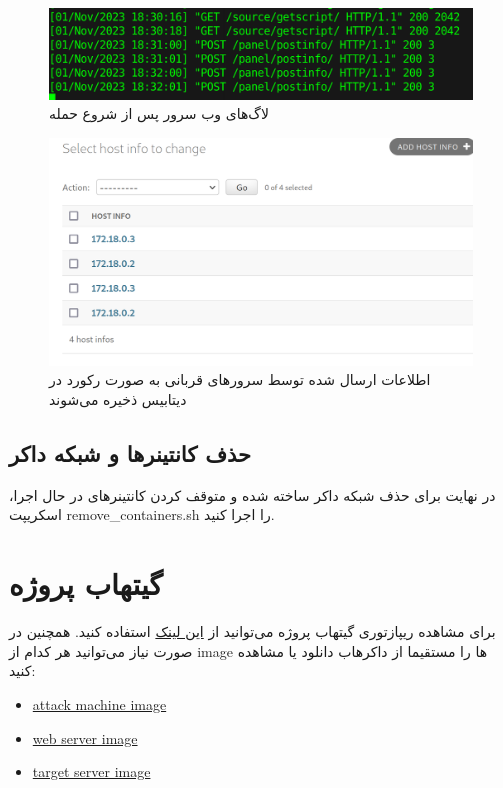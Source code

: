 \documentclass[11pt]{article}
\begin{document}
\begin{figure}[hbtp]
\caption{لاگ‌های وب سرور پس از شروع حمله}
\centering
\includegraphics[scale=0.2]{images/web_server_logs.png}
\end{figure}

\begin{figure}[hbtp]
\caption{اطلاعات ارسال شده توسط سرورهای قربانی به صورت رکورد در دیتابیس ذخیره می‌شوند}
\centering
\includegraphics[scale=0.2]{images/DB_panel.png}
\end{figure}


\subsection{حذف کانتینرها و شبکه داکر}
در نهایت برای حذف شبکه داکر ساخته شده و متوقف کردن کانتینرهای در حال اجرا، اسکریپت remove\_containers.sh را اجرا کنید.


\section{گیتهاب پروژه}
برای مشاهده ریپازتوری گیتهاب پروژه می‌توانید از \href{https://github.com/mohammad-osoolian/Network-Security-Project}{این لینک} استفاده کنید. همچنین در صورت نیاز می‌توانید هر کدام از image ها را مستقیما از داکرهاب دانلود یا مشاهده کنید:

\begin{itemize}
    \item \href{https://hub.docker.com/r/mohammad2782/attack-machine}{attack machine image}
    \item \href{https://hub.docker.com/r/mohammad2782/web-server}{web server image}
    \item \href{https://hub.docker.com/r/mohammad2782/target-server}{target server image}
\end{itemize}
\end{document}

